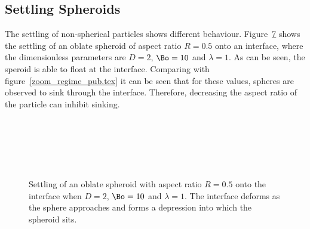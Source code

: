 {\subsection{Settling Spheroids}
\label{subsec:spheroids}

The settling of non-spherical particles shows different behaviour. Figure~\ref{fig:float_oblate} shows the settling of an oblate spheroid of aspect ratio $R = 0.5$ onto an interface, where the dimensionless parameters are $D = 2$, $\Bo = 10$ and $\lambda = 1$. As can be seen, the speroid is able to float at the interface. Comparing with figure~\ref{zoom_regime_pub.tex} it can be seen that for these values, spheres are observed to sink through the interface. Therefore, decreasing the aspect ratio of the particle can inhibit sinking. 

    \begin{figure}
      \centering
      \begin{subfigure}[b]{0.45\textwidth}
        \resizebox{\textwidth}{!}{\Large }
        \caption{}
        \label{fig:ob_float1}
      \end{subfigure}
      ~
      \begin{subfigure}[b]{0.45\textwidth}
        \resizebox{\textwidth}{!}{\Large }
        \caption{}
        \label{fig:ob_float2}
      \end{subfigure}
      
      \begin{subfigure}[b]{0.45\textwidth}
        \resizebox{\textwidth}{!}{\Large }
        \caption{}
        \label{fig:ob_float3}
      \end{subfigure}
      ~
      \begin{subfigure}[b]{0.45\textwidth}
        \resizebox{\textwidth}{!}{\Large }
        \caption{}
        \label{fig:ob_float4}
      \end{subfigure}
      
      \begin{subfigure}[b]{0.45\textwidth}
        \resizebox{\textwidth}{!}{\Large }
        \caption{}
        \label{fig:ob_float5}
      \end{subfigure}
      ~
      \begin{subfigure}[b]{0.45\textwidth}
        \resizebox{\textwidth}{!}{\large }
        \caption{}
        \label{fig:ob_float6}
      \end{subfigure}
      \caption{Settling of an oblate spheroid with aspect ratio $R = 0.5$ onto the interface when $D = 2$, $\Bo = 10$ and $\lambda = 1$. The interface deforms as the sphere approaches and forms a depression into which the spheroid sits. }\label{fig:float_oblate}
    \end{figure}

}
